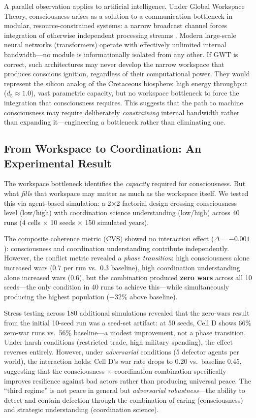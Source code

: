 \documentclass[10pt,letterpaper]{article}
\begin{document}
A parallel observation applies to artificial intelligence. Under Global
Workspace Theory, consciousness arises as a solution to a communication
bottleneck in modular, resource-constrained systems: a narrow broadcast
channel forces integration of otherwise independent processing streams
\cite{baars1988}. Modern large-scale neural networks (transformers) operate
with effectively unlimited internal bandwidth---no module is informationally
isolated from any other. If GWT is correct, such architectures may never
develop the narrow workspace that produces conscious ignition, regardless of
their computational power. They would represent the silicon analog of the
Cretaceous biosphere: high energy throughput ($d_5 \approx 1.0$), vast
parametric capacity, but no workspace bottleneck to force the integration
that consciousness requires. This suggests that the path to machine
consciousness may require deliberately \emph{constraining} internal
bandwidth rather than expanding it---engineering a bottleneck rather than
eliminating one.

\subsection*{From Workspace to Coordination: An Experimental Result}

The workspace bottleneck identifies the \emph{capacity} required for
consciousness. But what \emph{fills} that workspace may matter as much as
the workspace itself. We tested this via agent-based simulation:
a 2$\times$2 factorial design crossing consciousness level (low/high)
with coordination science understanding (low/high) across 40 runs
(4 cells $\times$ 10 seeds $\times$ 150 simulated years).

The composite coherence metric (CVS) showed no interaction effect
($\Delta = -0.001$): consciousness and coordination understanding
contribute independently. However, the conflict metric revealed a
\emph{phase transition}: high consciousness alone increased wars
(0.7 per run vs.\ 0.3 baseline), high coordination understanding alone
increased wars (0.6), but the combination produced \textbf{zero wars}
across all 10 seeds---the only condition in 40 runs to achieve this---while
simultaneously producing the highest population (+32\% above baseline).

Stress testing across 180 additional simulations revealed that the
zero-wars result from the initial 10-seed run was a seed-set artifact:
at 50 seeds, Cell D shows 66\% zero-war runs vs.\ 56\% baseline---a
modest improvement, not a phase transition. Under harsh conditions
(restricted trade, high military spending), the effect reverses entirely.
However, under \emph{adversarial} conditions (5 defector agents per
world), the interaction holds: Cell D's war rate drops to 0.20 vs.\
baseline 0.45, suggesting that the consciousness $\times$ coordination
combination specifically improves resilience against bad actors rather
than producing universal peace. The ``third regime'' is not peace in
general but \emph{adversarial robustness}---the ability to detect and
contain defection through the combination of caring (consciousness) and
strategic understanding (coordination science).
\end{document}
